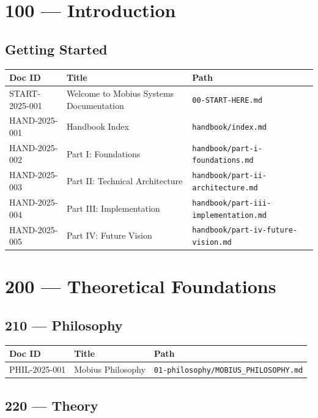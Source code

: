 \documentclass[11pt,a4paper]{article}
\begin{document}
\section{100 — Introduction}

\subsection{Getting Started}

\begin{longtable}{p{2cm}p{8cm}p{3cm}}
\toprule
\textbf{Doc ID} & \textbf{Title} & \textbf{Path} \\
\midrule
START-2025-001 & Welcome to Mobius Systems Documentation & \texttt{00-START-HERE.md} \\
HAND-2025-001 & Handbook Index & \texttt{handbook/index.md} \\
HAND-2025-002 & Part I: Foundations & \texttt{handbook/part-i-foundations.md} \\
HAND-2025-003 & Part II: Technical Architecture & \texttt{handbook/part-ii-architecture.md} \\
HAND-2025-004 & Part III: Implementation & \texttt{handbook/part-iii-implementation.md} \\
HAND-2025-005 & Part IV: Future Vision & \texttt{handbook/part-iv-future-vision.md} \\
\bottomrule
\end{longtable}

\section{200 — Theoretical Foundations}

\subsection{210 — Philosophy}

\begin{longtable}{p{2cm}p{8cm}p{3cm}}
\toprule
\textbf{Doc ID} & \textbf{Title} & \textbf{Path} \\
\midrule
PHIL-2025-001 & Mobius Philosophy & \texttt{01-philosophy/MOBIUS\_PHILOSOPHY.md} \\
\bottomrule
\end{longtable}

\subsection{220 — Theory}
\end{document}
